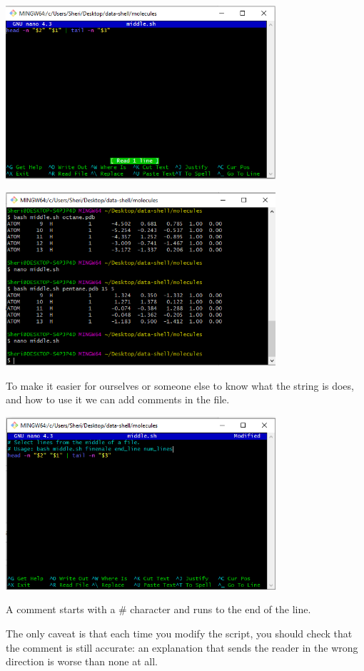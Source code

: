 \documentclass{article}
\begin{document}
\includegraphics[width=10cm]{Images/GitBash_056.PNG}

\includegraphics[width=10cm]{Images/GitBash_057.PNG}

To make it easier for ourselves or someone else to know what the string is does, and how to use it we can add comments in the file.

\includegraphics[width=10cm]{Images/GitBash_058.PNG}

A comment starts with a \# character and runs to the end of the line.

The only caveat is that each time you modify the script, you should check that the comment is still accurate: an explanation that sends the reader in the wrong direction is worse than none at all.
\end{document}
